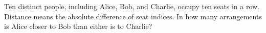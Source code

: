 Ten distinct people, including Alice, Bob, and Charlie, occupy ten seats in a row. Distance means the absolute difference of seat indices. In how many arrangements is Alice closer to Bob than either is to Charlie?

